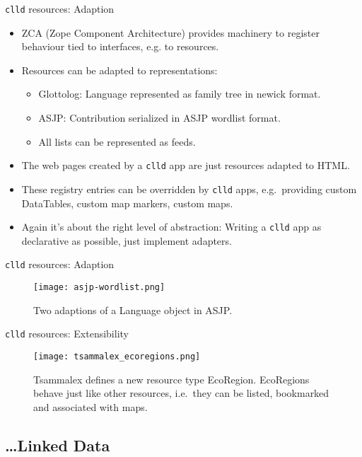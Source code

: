 \documentclass{beamer}
\begin{document}
%
%
\begin{frame}{\texttt{clld} resources: Adaption}
\begin{itemize}
\item ZCA (Zope Component Architecture) provides machinery to register behaviour tied to
interfaces, e.g. to resources.
\item Resources can be adapted to representations:
\begin{itemize}
\item Glottolog: Language represented as family tree in newick format.
\item ASJP: Contribution serialized in ASJP wordlist format.
\item All lists can be represented as feeds.
\end{itemize}
\item The web pages created by a \texttt{clld} app are just resources
adapted to HTML.
\item These registry entries can be overridden by \texttt{clld} apps,
e.g.~providing custom DataTables, custom map markers, custom maps.
\item Again it's about the right level of abstraction: Writing a \texttt{clld} app
as declarative as possible, just implement adapters.
\end{itemize}
\end{frame}


\begin{frame}{\texttt{clld} resources: Adaption}
\begin{figure}
\texttt{[image: asjp-wordlist.png]}
\caption{\label{fig:asjp}Two adaptions of a Language object in ASJP.}
\end{figure}
\end{frame}


\begin{frame}{\texttt{clld} resources: Extensibility}
\begin{figure}
\texttt{[image: tsammalex\_ecoregions.png]}
\caption{\label{fig:ecoregions}Tsammalex defines a new resource type EcoRegion.
EcoRegions behave just
like other resources, i.e.~they can be listed, bookmarked and
associated with maps.}
\end{figure}
\end{frame}


\subsection{\dots Linked Data}
\end{document}
